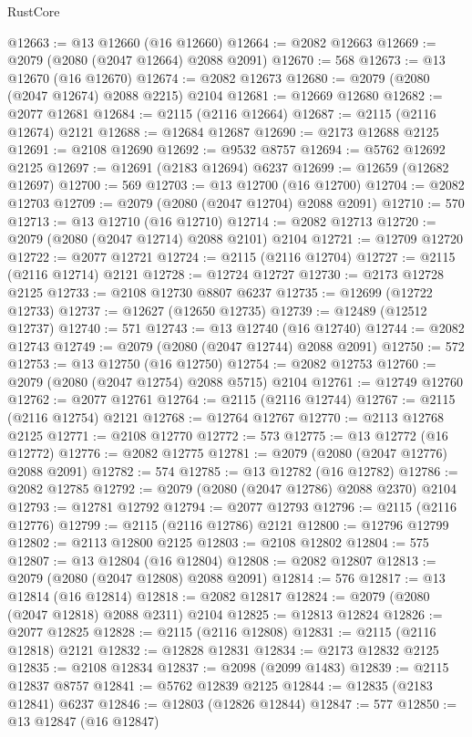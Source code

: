 \begin{lexlean}{RustCore}
\begin{coremodule}
@12663 := @13 @12660 (@16 @12660)
@12664 := @2082 @12663
@12669 := @2079 (@2080 (@2047 @12664) @2088 @2091)
@12670 := 568
@12673 := @13 @12670 (@16 @12670)
@12674 := @2082 @12673
@12680 := @2079 (@2080 (@2047 @12674) @2088 @2215) @2104
@12681 := @12669 @12680
@12682 := @2077 @12681
@12684 := @2115 (@2116 @12664)
@12687 := @2115 (@2116 @12674) @2121
@12688 := @12684 @12687
@12690 := @2173 @12688 @2125
@12691 := @2108 @12690
@12692 := @9532 @8757
@12694 := @5762 @12692 @2125
@12697 := @12691 (@2183 @12694) @6237
@12699 := @12659 (@12682 @12697)
@12700 := 569
@12703 := @13 @12700 (@16 @12700)
@12704 := @2082 @12703
@12709 := @2079 (@2080 (@2047 @12704) @2088 @2091)
@12710 := 570
@12713 := @13 @12710 (@16 @12710)
@12714 := @2082 @12713
@12720 := @2079 (@2080 (@2047 @12714) @2088 @2101) @2104
@12721 := @12709 @12720
@12722 := @2077 @12721
@12724 := @2115 (@2116 @12704)
@12727 := @2115 (@2116 @12714) @2121
@12728 := @12724 @12727
@12730 := @2173 @12728 @2125
@12733 := @2108 @12730 @8807 @6237
@12735 := @12699 (@12722 @12733)
@12737 := @12627 (@12650 @12735)
@12739 := @12489 (@12512 @12737)
@12740 := 571
@12743 := @13 @12740 (@16 @12740)
@12744 := @2082 @12743
@12749 := @2079 (@2080 (@2047 @12744) @2088 @2091)
@12750 := 572
@12753 := @13 @12750 (@16 @12750)
@12754 := @2082 @12753
@12760 := @2079 (@2080 (@2047 @12754) @2088 @5715) @2104
@12761 := @12749 @12760
@12762 := @2077 @12761
@12764 := @2115 (@2116 @12744)
@12767 := @2115 (@2116 @12754) @2121
@12768 := @12764 @12767
@12770 := @2113 @12768 @2125
@12771 := @2108 @12770
@12772 := 573
@12775 := @13 @12772 (@16 @12772)
@12776 := @2082 @12775
@12781 := @2079 (@2080 (@2047 @12776) @2088 @2091)
@12782 := 574
@12785 := @13 @12782 (@16 @12782)
@12786 := @2082 @12785
@12792 := @2079 (@2080 (@2047 @12786) @2088 @2370) @2104
@12793 := @12781 @12792
@12794 := @2077 @12793
@12796 := @2115 (@2116 @12776)
@12799 := @2115 (@2116 @12786) @2121
@12800 := @12796 @12799
@12802 := @2113 @12800 @2125
@12803 := @2108 @12802
@12804 := 575
@12807 := @13 @12804 (@16 @12804)
@12808 := @2082 @12807
@12813 := @2079 (@2080 (@2047 @12808) @2088 @2091)
@12814 := 576
@12817 := @13 @12814 (@16 @12814)
@12818 := @2082 @12817
@12824 := @2079 (@2080 (@2047 @12818) @2088 @2311) @2104
@12825 := @12813 @12824
@12826 := @2077 @12825
@12828 := @2115 (@2116 @12808)
@12831 := @2115 (@2116 @12818) @2121
@12832 := @12828 @12831
@12834 := @2173 @12832 @2125
@12835 := @2108 @12834
@12837 := @2098 (@2099 @1483)
@12839 := @2115 @12837 @8757
@12841 := @5762 @12839 @2125
@12844 := @12835 (@2183 @12841) @6237
@12846 := @12803 (@12826 @12844)
@12847 := 577
@12850 := @13 @12847 (@16 @12847)

\end{coremodule}
\end{lexlean}
